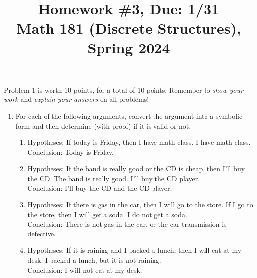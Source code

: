 \documentclass[11pt]{article}
\title{Homework \#3, Due: 1/31 \\Math 181 (Discrete Structures), Spring 2024}
\date{}
\begin{document}
\maketitle

\thispagestyle{empty}

\vspace{-1cm}

Problem 1 is worth 10 points, for a total of 10 points. Remember to \emph{show your work} and \emph{explain your answers} on all problems!

\begin{enumerate}
\item For each of the following arguments, convert the argument into a symbolic form and then determine (with proof) if it is valid or not.
\begin{enumerate}
\item Hypotheses: If today is Friday, then I have math class. I have math class. \\ Conclusion: Today is Friday.
\item Hypotheses: If the band is really good or the CD is cheap, then I'll buy the CD. The band is really good. I'll buy the CD player. \\ Conclusion: I'll buy the CD and the CD player.
\item Hypotheses: If there is gas in the car, then I will go to the store. If I go to the store, then I will get a soda. I do not get a soda. \\ Conclusion: There is not gas in the car, or the car transmission is defective.
\item Hypotheses: If it is raining and I packed a lunch, then I will eat at my desk. I packed a lunch, but it is not raining. \\ Conclusion: I will not eat at my desk.
\end{enumerate}
\end{enumerate}
\end{document}
